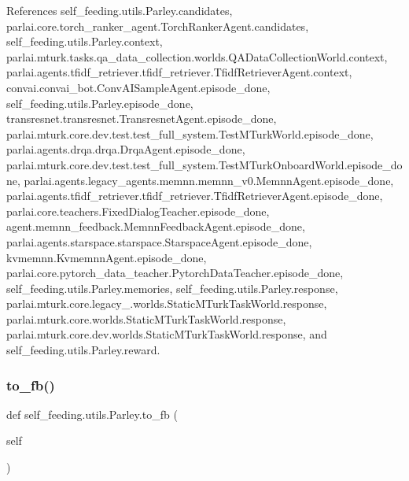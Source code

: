 References self\+\_\+feeding.\+utils.\+Parley.\+candidates, parlai.\+core.\+torch\+\_\+ranker\+\_\+agent.\+Torch\+Ranker\+Agent.\+candidates, self\+\_\+feeding.\+utils.\+Parley.\+context, parlai.\+mturk.\+tasks.\+qa\+\_\+data\+\_\+collection.\+worlds.\+Q\+A\+Data\+Collection\+World.\+context, parlai.\+agents.\+tfidf\+\_\+retriever.\+tfidf\+\_\+retriever.\+Tfidf\+Retriever\+Agent.\+context, convai.\+convai\+\_\+bot.\+Conv\+A\+I\+Sample\+Agent.\+episode\+\_\+done, self\+\_\+feeding.\+utils.\+Parley.\+episode\+\_\+done, transresnet.\+transresnet.\+Transresnet\+Agent.\+episode\+\_\+done, parlai.\+mturk.\+core.\+dev.\+test.\+test\+\_\+full\+\_\+system.\+Test\+M\+Turk\+World.\+episode\+\_\+done, parlai.\+agents.\+drqa.\+drqa.\+Drqa\+Agent.\+episode\+\_\+done, parlai.\+mturk.\+core.\+dev.\+test.\+test\+\_\+full\+\_\+system.\+Test\+M\+Turk\+Onboard\+World.\+episode\+\_\+done, parlai.\+agents.\+legacy\+\_\+agents.\+memnn.\+memnn\+\_\+v0.\+Memnn\+Agent.\+episode\+\_\+done, parlai.\+agents.\+tfidf\+\_\+retriever.\+tfidf\+\_\+retriever.\+Tfidf\+Retriever\+Agent.\+episode\+\_\+done, parlai.\+core.\+teachers.\+Fixed\+Dialog\+Teacher.\+episode\+\_\+done, agent.\+memnn\+\_\+feedback.\+Memnn\+Feedback\+Agent.\+episode\+\_\+done, parlai.\+agents.\+starspace.\+starspace.\+Starspace\+Agent.\+episode\+\_\+done, kvmemnn.\+Kvmemnn\+Agent.\+episode\+\_\+done, parlai.\+core.\+pytorch\+\_\+data\+\_\+teacher.\+Pytorch\+Data\+Teacher.\+episode\+\_\+done, self\+\_\+feeding.\+utils.\+Parley.\+memories, self\+\_\+feeding.\+utils.\+Parley.\+response, parlai.\+mturk.\+core.\+legacy\+\_.\+worlds.\+Static\+M\+Turk\+Task\+World.\+response, parlai.\+mturk.\+core.\+worlds.\+Static\+M\+Turk\+Task\+World.\+response, parlai.\+mturk.\+core.\+dev.\+worlds.\+Static\+M\+Turk\+Task\+World.\+response, and self\+\_\+feeding.\+utils.\+Parley.\+reward.

\mbox{\label{classself__feeding_1_1utils_1_1Parley_a1d651fb1702af3ec617c362e4bda625f}} 
\subsubsection{\texorpdfstring{to\+\_\+fb()}{to\_fb()}}
{\footnotesize\ttfamily def self\+\_\+feeding.\+utils.\+Parley.\+to\+\_\+fb (\begin{DoxyParamCaption}\item[{}]{self }\end{DoxyParamCaption})}



